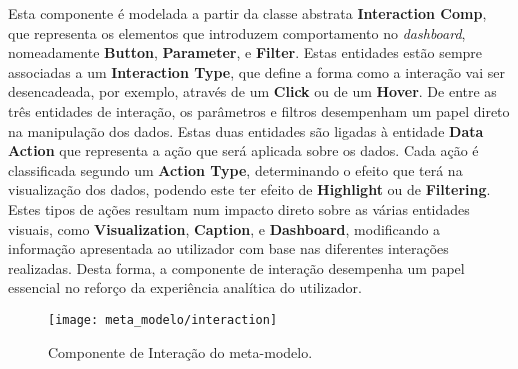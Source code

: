 Esta componente é modelada a partir da classe abstrata \textbf{Interaction Comp}, que representa os elementos que introduzem comportamento no \textit{dashboard}, nomeadamente \textbf{Button}, \textbf{Parameter}, e \textbf{Filter}. Estas entidades estão sempre associadas a um \textbf{Interaction Type}, que define a forma como a interação vai ser desencadeada, por exemplo, através de um \textbf{Click} ou de um \textbf{Hover}. De entre as três entidades de interação, os parâmetros e filtros desempenham um papel direto na manipulação dos dados. Estas duas entidades são ligadas à entidade \textbf{Data Action} que representa a ação que será aplicada sobre os dados. Cada ação é classificada segundo um \textbf{Action Type}, determinando o efeito que terá na visualização dos dados, podendo este ter efeito de \textbf{Highlight} ou de \textbf{Filtering}. Estes tipos de ações resultam num impacto direto sobre as várias entidades visuais, como \textbf{Visualization}, \textbf{Caption}, e \textbf{Dashboard}, modificando a informação apresentada ao utilizador com base nas diferentes interações realizadas. Desta forma, a componente de interação desempenha um papel essencial no reforço da experiência analítica do utilizador. 

\begin{figure}[htbp]
  \texttt{[image: meta\_modelo/interaction]}
  \centering
  \caption{Componente de Interação do meta-modelo.}
  \label{fig:interaction}
\end{figure}

